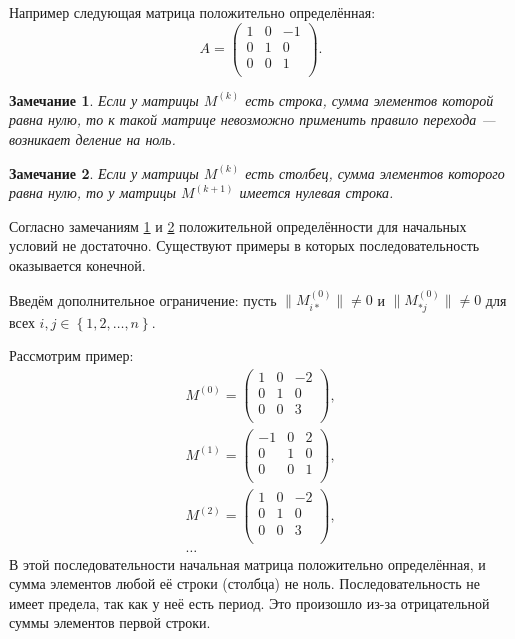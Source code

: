 \documentclass{article}
\newtheorem{remark}{Замечание}
\newcommand{\Abs}[1]{\lVert{}#1{}\rVert}
\newcommand{\Mk}[1][k]{M^{(#1)}}
\begin{document}
Например следующая матрица положительно определённая:  
\begin{displaymath}
  A = \left(
  \begin{array}{ccc}
      1 & 0 & -1 \\
      0 & 1 &  0 \\
      0 & 0 &  1 \\
  \end{array}
  \right).
\end{displaymath}

\begin{remark}
  \label{remark:row_sum_zero}
  Если у матрицы $\Mk$ есть строка, сумма элементов которой равна нулю, то к такой матрице невозможно применить правило перехода — возникает деление на ноль.
\end{remark}

\begin{remark}
  \label{remark:col_sum_zero}
  Если у матрицы $\Mk$ есть столбец, сумма элементов которого равна нулю, то у матрицы $\Mk[k + 1]$ имеется нулевая строка.
\end{remark}

Согласно замечаниям \ref{remark:row_sum_zero} и \ref{remark:col_sum_zero} положительной определённости для начальных условий не достаточно. Существуют примеры в которых последовательность оказывается конечной.

Введём дополнительное ограничение: пусть $\Abs{\Mk[0]_{i*}} \not= 0$ и $\Abs{\Mk[0]_{*j}} \not= 0$ для всех $i, j \in \left\{ 1, 2, \ldots, n \right\}.$

Рассмотрим пример:
\begin{gather*}
  \Mk[0] = \left(
  \begin{array}{ccc}
      1 & 0 & -2 \\
      0 & 1 &  0 \\
      0 & 0 &  3 \\
  \end{array}
  \right), \\
  \Mk[1] = \left(
  \begin{array}{ccc}
     -1 & 0 &  2 \\
      0 & 1 &  0 \\
      0 & 0 &  1 \\
  \end{array}
  \right), \\
  \Mk[2] = \left(
  \begin{array}{ccc}
      1 & 0 & -2 \\
      0 & 1 &  0 \\
      0 & 0 &  3 \\
  \end{array}
  \right), \\
  \ldots
\end{gather*}
В этой последовательности начальная матрица положительно определённая, и сумма элементов любой её строки (столбца) не ноль.
Последовательность не имеет предела, так как у неё есть период. Это произошло из-за отрицательной суммы элементов первой строки.
\end{document}
